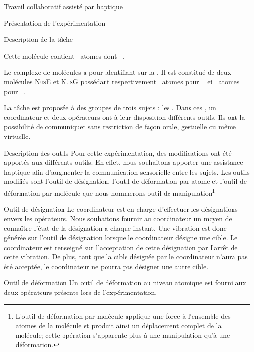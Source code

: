 \documentclass[myfrancais,ngerman,english,frenchb]{mythesis}
\begin{document}
\begin{mychapter}{Travail collaboratif assisté par haptique}
\begin{mysection}{Présentation de l'expérimentation}
\begin{mysubsection}{Description de la tâche}
\begin{description}
						Cette molécule contient ~atomes dont ~.
					\item[\myNusENusG]
						Le complexe de molécules \myNusENusG {} a pour identifiant \myPDB {} sur la \myPDBbase\footnotemark[\value{footnote}].
						Il est constitué de deux molécules \textsc{NusE} et \textsc{NusG} possédant respectivement ~atomes pour ~ et ~atomes pour ~.
				\end{description}

				La tâche est proposée à des groupes de trois sujets : les .
				Dans ces , un \og coordinateur \fg et deux \og opérateurs \fg ont à leur disposition différents outils.
				Ils ont la possibilité de communiquer sans restriction de façon orale, gestuelle ou même virtuelle.
				\begin{mysubsubsection}{Description des outils}
					Pour cette expérimentation, des modifications ont été apportés aux différents outils.
					En effet, nous souhaitons apporter une assistance haptique afin d'augmenter la communication sensorielle entre les sujets.
					Les outils modifiés sont l'outil de désignation, l'outil de déformation par atome et l'outil de déformation par molécule que nous nommerons outil de manipulation\footnote{L'outil de déformation par molécule applique une force à l'ensemble des atomes de la molécule et produit ainsi un déplacement complet de la molécule; cette opération s'apparente plus à une manipulation qu'à une déformation.}
					\begin{myparagraph}{Outil de désignation}
						Le coordinateur est en charge d'effectuer les désignations envers les opérateurs.
						Nous souhaitons fournir au coordinateur un moyen de connaître l'état de la désignation à chaque instant.
						Une vibration est donc générée sur l'outil de désignation lorsque le coordinateur désigne une cible.
						Le coordinateur est renseigné sur l'acceptation de cette désignation par l'arrêt de cette vibration.
						De plus, tant que la cible désignée par le coordinateur n'aura pas été acceptée, le coordinateur ne pourra pas désigner une autre cible.
					\end{myparagraph}
					\begin{myparagraph}{Outil de déformation}
						Un outil de déformation au niveau atomique est fourni aux deux opérateurs présents lors de l'expérimentation.

\end{myparagraph}
\end{mysubsubsection}
\end{mysubsection}
\end{mysection}
\end{mychapter}
\end{document}
